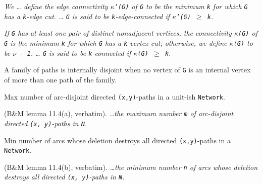 \begin{definition}
\label{Networks.edgeConnectivity}
\leanok
\emph{We \dots{} define the edge connectivity
\texttt{$\kappa$'(G)} of \texttt{G} to be the minimum \texttt{k} for which \texttt{G} has a \texttt{k}-edge cut. \dots{}  \texttt{G} is
said to be \texttt{k}-edge-connected if \texttt{$\kappa$'(G) $\ge$ k}.}
\end{definition}

\begin{definition}
\label{Networks.vertexConnectivity}
\leanok
\emph{If \texttt{G} has at least one pair of distinct
nonadjacent vertices, the connectivity \texttt{$\kappa$(G)} of \texttt{G} is the minimum
\texttt{k} for which
\texttt{G} has a \texttt{k}-vertex cut; otherwise, we define \texttt{$\kappa$(G)} to be \texttt{$\nu$ - 1}. \dots{}  \texttt{G} is said
to be \texttt{k}-connected if \texttt{$\kappa$(G) $\ge$ k}.}
\end{definition}

\begin{definition}
\label{Networks.InternallyDisjoint}
\leanok
A family of paths is internally disjoint when no
vertex of \texttt{G} is an internal vertex of more than one path of the family.
\end{definition}

\begin{definition}
\label{Networks.Network.maxArcDisjointPaths}
Max number of arc-disjoint directed \texttt{(x,y)}-paths in a unit-ish \texttt{Network}.

(B\&M lemma 11.4(a), verbatim). \emph{\dots{}the maximum number \texttt{m} of
arc-disjoint directed \texttt{(x, y)}-paths in \texttt{N}.}
\end{definition}

\begin{definition}
\label{Networks.Network.minArcsDestroyingPaths}
Min number of arcs whose deletion destroys all directed \texttt{(x,y)}-paths in a
\texttt{Network}.

(B\&M lemma 11.4(b), verbatim). \emph{\dots{}the minimum number \texttt{n} of arcs whose
deletion destroys all directed \texttt{(x, y)}-paths in \texttt{N}.}
\end{definition}

